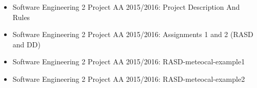 \begin{itemize}
	\item Software Engineering 2 Project AA 2015/2016: Project Description And Rules
	\item Software Engineering 2 Project AA 2015/2016: Assignments 1 and 2 (RASD and DD) 
	\item Software Engineering 2 Project AA 2015/2016: RASD-meteocal-example1
	\item Software Engineering 2 Project AA 2015/2016: RASD-meteocal-example2
	
\end{itemize}
